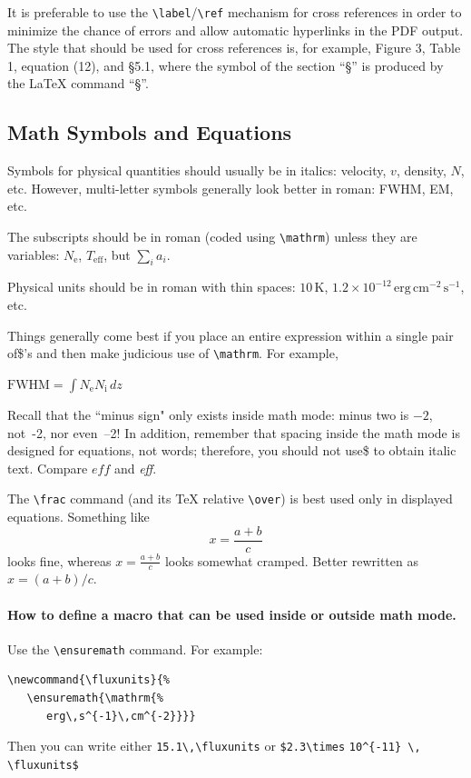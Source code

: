 \documentclass[10pt,letter,twoside]{rmat-rho}
\newcommand{\CS}[1]{\texttt{\textbackslash #1}}
\newenvironment{Example}
{\begin{list}{}{\setlength{\leftmargin}{10pt}\setlength{\rightmargin}{10pt}}%
  \item[]\itshape}
  {\end{list}}
\begin{document}
It is preferable to use the \CS{label}/\CS{ref} mechanism for cross references in order to minimize the chance of errors and
allow automatic hyperlinks in the PDF output. The style that should be used for cross references is, for example, Figure 3, Table 1, equation (12), and \S 5.1, where the symbol of the section “§” is produced by the \LaTeX{} command “\S”.

\subsection{Math Symbols and Equations}
\label{sec:math}

Symbols for physical quantities should usually be in italics: velocity,
$v$, density, $N$, etc. However, multi-letter symbols generally look
better in roman: FWHM, EM, etc. 

The subscripts should be in roman (coded using \CS{mathrm}) unless they are variables:
$N_\mathrm{e}$, $T_\mathrm{eff}$, but $\sum_i a_i$. 

Physical units should be in roman with thin spaces: $10\,\mathrm{K}$, $1.2\times
10^{-12} \,\mathrm{erg\,cm^{-2}\,s^{-1}}$, etc. 

Things generally come
best if you place an entire expression within a single pair of\$'s and then make judicious use of \CS{mathrm}. For example,
\begin{Example}
  $ \mathrm{FWHM} = \int N_\mathrm{e} N_\mathrm{i} \, dz $ 
\end{Example}

Recall that the ``minus sign" only exists inside math mode: minus two is $-2$, not~-2, nor \hbox{even --2!} In addition, remember that spacing inside the math mode is designed for equations, not words; therefore, you should not use\$ to obtain italic text. Compare $eff$ and \textit{eff}. 

The \CS{frac} command (and its \TeX{} relative \CS{over}) is best used only in displayed equations. Something like 
\begin{equation}
  \label{eq:one}
  x = \frac { a + b } { c } 
\end{equation}
looks fine, whereas $x = \frac { a + b } { c }$ looks somewhat cramped. Better rewritten as $x = (a + b) / c $. 

\paragraph{How to define a macro that can be used inside or outside  math mode.} Use the \CS{ensuremath} command. For example: 
\begin{verbatim}
\newcommand{\fluxunits}{%
   \ensuremath{\mathrm{%
      erg\,s^{-1}\,cm^{-2}}}}
\end{verbatim}
Then you can write either \verb+15.1\,\fluxunits+ or
\verb+$2.3\times+ \verb+10^{-11} \,+ \verb+\fluxunits$+
\end{document}
